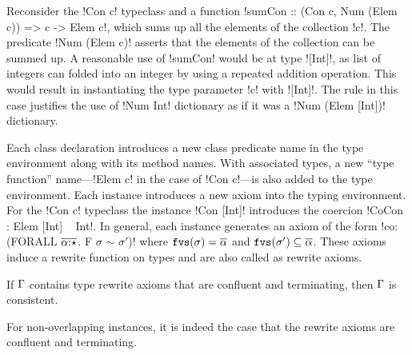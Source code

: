 \documentclass[screen,nonacm,manuscript,review]{acmart} %
\begin{document}
Reconsider the !Con c! typeclass and a function
!sumCon :: (Con c, Num (Elem c)) => c -> Elem c!, which sums up all
the elements of the collection !c!. The predicate !Num (Elem c)!
asserts that the elements of the collection can be summed up. A
reasonable use of !sumCon! would be at type ![Int]!, as list of
integers can folded into an integer by using a repeated addition
operation. This would result in instantiating the type parameter !c!
with ![Int]!. The rule  in this case justifies the use of
!Num Int! dictionary as if it was a !Num (Elem [Int])! dictionary.


Each class declaration introduces a new class predicate name in the type environment along with its method names. With associated types, a new ``type function'' name---!Elem c! in the case of !Con c!---is also added to the type environment.
Each instance introduces a new axiom into the typing environment. For the !Con c! typeclass the instance !Con [Int]! introduces the coercion !CoCon : Elem [Int] ~ Int!. In general, each instance generates an axiom of the form !co: (FORALL $\overline{\alpha{:}\star}$. F $\sigma$ $\sim$ $\sigma'$)! where $\texttt{fvs}(\sigma) = \overline{\alpha}$
and $\texttt{fvs}(\sigma') \subseteq \overline{\alpha}$. These axioms induce a rewrite function on types and are also called as rewrite axioms.

\begin{theorem}
If $\Gamma$ contains type rewrite axioms that are confluent and terminating, then $\Gamma$ is consistent.
\end{theorem}
For non-overlapping instances, it is indeed the case that the rewrite axioms are confluent and terminating.
\end{document}
